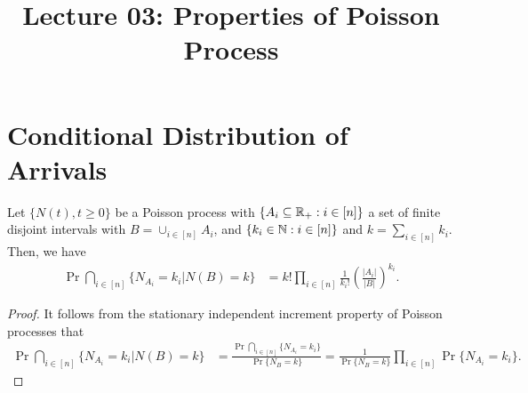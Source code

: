 \documentclass[a4paper,10pt,english]{article}
\title{Lecture 03: Properties of Poisson Process}
\author{}
\begin{document}
\maketitle

\section{Conditional Distribution of Arrivals}
\begin{prop}\label{Prop:SIIPoisson}
Let $\{N(t), t\geqslant 0\}$ be a Poisson process with $\{A_i \subseteq \mathbb{R}_+: i \in [n]\}$ a set of finite disjoint intervals with $B = \cup_{i \in [n]}A_i$, and $\{k_i \in \mathbb{N} : i \in [n]\}$ and $k = \sum_{i \in [n]}k_i$. Then, we have 
\begin{align*}
\Pr\bigcap_{i \in [n]}\{N_{A_i} = k_i | N(B) = k\} &= k!\prod_{i \in [n]}\frac{1}{k_i!}\left(\frac{|A_i|}{|B|}\right)^{k_i}.
\end{align*}
\end{prop}
\begin{proof}
It follows from the stationary independent increment property of Poisson processes that
\begin{align*}
\Pr\bigcap_{i \in [n]}\{N_{A_i} = k_i | N(B) = k\} &= \frac{\Pr\bigcap_{i \in [n]}\{N_{A_i} = k_i\}}{\Pr\{N_B = k\}} = \frac{1}{\Pr\{N_B = k\}}\prod_{i \in [n]}\Pr\{N_{A_i} = k_i\}.
\end{align*}
\end{proof}
\end{document}
